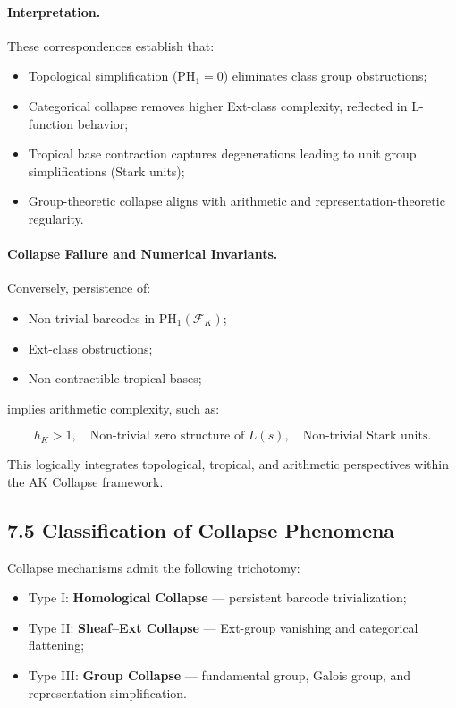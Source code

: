 \documentclass[11pt]{article}
\begin{document}
\paragraph{Interpretation.}
These correspondences establish that:

\begin{itemize}
    \item Topological simplification (\( \mathrm{PH}_1 = 0 \)) eliminates class group obstructions;
    \item Categorical collapse removes higher Ext-class complexity, reflected in L-function behavior;
    \item Tropical base contraction captures degenerations leading to unit group simplifications (Stark units);
    \item Group-theoretic collapse aligns with arithmetic and representation-theoretic regularity.
\end{itemize}

\paragraph{Collapse Failure and Numerical Invariants.}
Conversely, persistence of:

\begin{itemize}
    \item Non-trivial barcodes in \( \mathrm{PH}_1(\mathcal{F}_K) \);
    \item Ext-class obstructions;
    \item Non-contractible tropical bases;
\end{itemize}

implies arithmetic complexity, such as:

\[
h_K > 1, \quad \text{Non-trivial zero structure of } L(s), \quad \text{Non-trivial Stark units}.
\]

This logically integrates topological, tropical, and arithmetic perspectives within the AK Collapse framework.


\subsection*{7.5 Classification of Collapse Phenomena}

Collapse mechanisms admit the following trichotomy:

\begin{itemize}
    \item Type I: \textbf{Homological Collapse} — persistent barcode trivialization;
    \item Type II: \textbf{Sheaf–Ext Collapse} — Ext-group vanishing and categorical flattening;
    \item Type III: \textbf{Group Collapse} — fundamental group, Galois group, and representation simplification.
\end{itemize}
\end{document}
